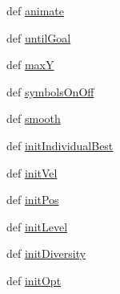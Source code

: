 \begin{CompactItemize}
\item 
def \hyperlink{namespacepsostart_952ed2c117d6b30cdc76dcbeec8e2648}{animate}
\item 
def \hyperlink{namespacepsostart_5f4510c654c11f9563d93168d8e8a79d}{untilGoal}
\item 
def \hyperlink{namespacepsostart_bde7b09ba08380884f780c01920a0fe6}{maxY}
\item 
def \hyperlink{namespacepsostart_cdf8c0a98654013e6c8154ca856a6a77}{symbolsOnOff}
\item 
def \hyperlink{namespacepsostart_f3fe32915af5f6cb095ba0746ed8ad18}{smooth}
\item 
def \hyperlink{namespacepsostart_71d637a8ccfe37c4783356eb773fc939}{initIndividualBest}
\item 
def \hyperlink{namespacepsostart_0abfc7cedfcbc57d2f8c758ade95fc53}{initVel}
\item 
def \hyperlink{namespacepsostart_26ae226d8a56f01c4ad8de5499c4c42d}{initPos}
\item 
def \hyperlink{namespacepsostart_dbf928f72dda2c955f6245de30c92a9c}{initLevel}
\item 
def \hyperlink{namespacepsostart_6caa54532dab5827895d1d10621282c8}{initDiversity}
\item 
def \hyperlink{namespacepsostart_6042fe4e98a1279b95d7789fd881f38f}{initOpt}
\end{CompactItemize}
